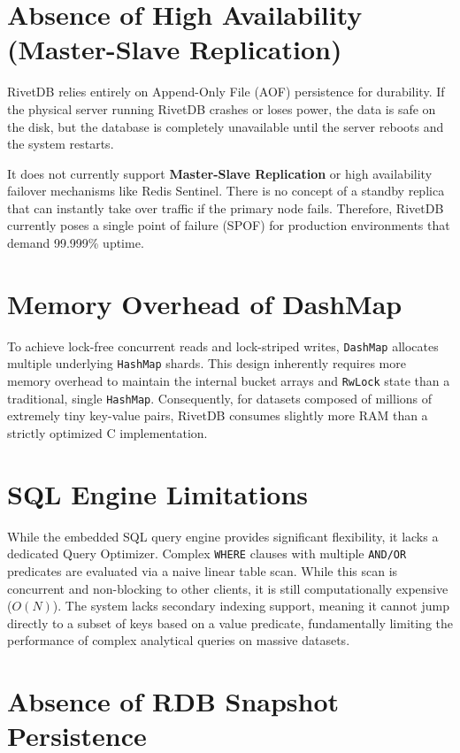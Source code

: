 \section{Absence of High Availability (Master-Slave Replication)}

RivetDB relies entirely on Append-Only File (AOF) persistence for durability. If the physical server running RivetDB crashes or loses power, the data is safe on the disk, but the database is completely unavailable until the server reboots and the system restarts. 

It does not currently support \textbf{Master-Slave Replication} or high availability failover mechanisms like Redis Sentinel. There is no concept of a standby replica that can instantly take over traffic if the primary node fails. Therefore, RivetDB currently poses a single point of failure (SPOF) for production environments that demand 99.999\% uptime.

\section{Memory Overhead of DashMap}

To achieve lock-free concurrent reads and lock-striped writes, \texttt{DashMap} allocates multiple underlying \texttt{HashMap} shards. This design inherently requires more memory overhead to maintain the internal bucket arrays and \texttt{RwLock} state than a traditional, single \texttt{HashMap}. Consequently, for datasets composed of millions of extremely tiny key-value pairs, RivetDB consumes slightly more RAM than a strictly optimized C implementation.

\section{SQL Engine Limitations}

While the embedded SQL query engine provides significant flexibility, it lacks a dedicated Query Optimizer. Complex \texttt{WHERE} clauses with multiple \texttt{AND/OR} predicates are evaluated via a naive linear table scan. While this scan is concurrent and non-blocking to other clients, it is still computationally expensive ($O(N)$). The system lacks secondary indexing support, meaning it cannot jump directly to a subset of keys based on a value predicate, fundamentally limiting the performance of complex analytical queries on massive datasets.

\section{Absence of RDB Snapshot Persistence}


